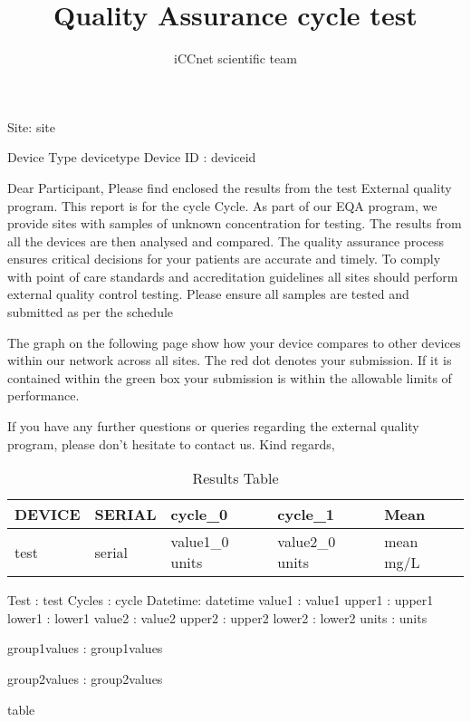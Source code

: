 \documentclass{article}
\author{iCCnet scientific team}
\title{Quality Assurance {{cycle}} {{test}} }
\begin{document}
Site: {{site}}

Device Type {{devicetype}}
Device ID : {{deviceid}}


Dear Participant,
\hline
Please find enclosed the results from the {{test}} External quality program. This report is for the {{cycle}} Cycle. As part of our EQA program, we provide sites with samples of unknown concentration for testing. The results from all the devices are then analysed and compared. The quality assurance process ensures critical decisions for your patients are accurate and timely. To comply with point of care standards and accreditation guidelines all sites should perform external quality control testing. Please ensure all samples are tested and submitted as per the schedule

The graph on the following page show how your device compares to other devices within our network across all sites. The red dot denotes your submission. If it is contained within the green box your submission is within the allowable limits of performance.

If you have any further questions or queries regarding the external quality program, please don't hesitate to contact us.
\hline
Kind regards,

\begin{table}[h]
\centering
\begin{tabular}{|l|l|l|l|l|}
\hline
\textbf{DEVICE} & \textbf{SERIAL} & \textbf{ {{cycle_0}} } & \textbf{ {{cycle_1}} } & \textbf{ Mean } \\ \hline
{{test}}         & {{serial}}       & {{value1_0}} {{units}} & {{value2_0}} {{units}}    & {{mean}} mg/L    \\ \hline
\end{tabular}
\caption{Results Table}
\label{your-table-label}
\end{table}


Test : {{test}}
Cycles : {{cycle}}
Datetime:  {{datetime}}
value1 : {{value1}}
upper1 : {{upper1}}
lower1 : {{lower1}}
value2 : {{value2}}
upper2 : {{upper2}}
lower2 : {{lower2}}
units : {{units}}


group1values : {{group1values}}


group2values : {{group2values}}

{{table}}
\end{document}
